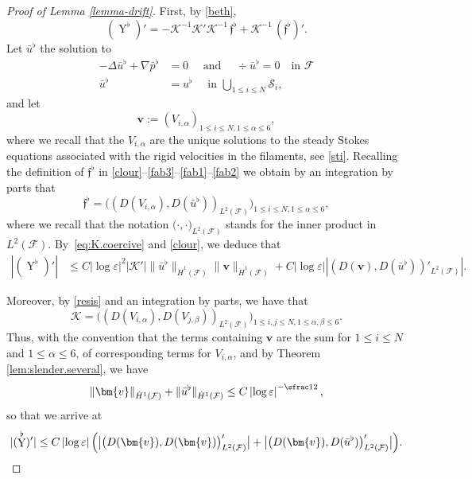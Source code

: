 \documentclass[JEP,XML,SOM,Unicode, NoEqCountersInSection,NoFloatCountersInSection,published]{cedram}
\newcommand{\bv}{\bm{v}}
\let\eps\varepsilon
\DeclareMathOperator{\Y}{Y}
\theoremstyle{definition}
\theoremstyle{remark}
\begin{document}
\begin{proof}[Proof of Lemma \ref{lemma-drift}]
First, by \eqref{beth},
\begin{equation}
(\Y^\flat)'
= - \mathcal K^{-1} \mathcal K' \mathcal K^{-1} \, \mathfrak{f}^\flat + \mathcal K^{-1} \, (\mathfrak{f}^\flat)'.
\end{equation}
Let $\bar u^\flat$ the solution to
\begin{align*}
- \Delta \bar u^\flat + \nabla \bar p^\flat &= 0 \quad \text{ and }\quad \div {\bar u^\flat} = 0 \quad \text{in } \mathcal F \\
\bar u^\flat &= u^\flat \quad \text{ in } \bigcup_{1 \leq i \leq N} \mathcal S_i,
\end{align*}
and let
\[
\bv := (V_{i,\alpha})_{1\leq i \leq N, 1 \leq \alpha \leq 6},\]
where we recall that the $ V_{i,\alpha}$ are the unique solutions to the steady Stokes equations associated with the rigid velocities in the filaments, see \eqref{sti}.
Recalling the definition of $ \mathfrak{f}^\flat $ in \eqref{clour}--\eqref{fab3}--\eqref{fab1}--\eqref{fab2}
we obtain by an integration by parts that
\begin{equation*}
\mathfrak{f}^\flat = \Big((D (V_{i,\alpha}),D (\bar u^\flat))_{L^2(\mathcal F)} \Big)_{1\leq i \leq N, 1 \leq \alpha \leq 6},
\end{equation*}
where we recall that the notation $\big(\cdot, \cdot\big)_{L^2(\mathcal F)}$ stands for the inner product in $L^2(\mathcal F)$.
By~\eqref{eq:K.coercive} and \eqref{clour},
we deduce that
\begin{equation}
\begin{aligned}
|(\Y^\flat)'| &\leq C \left|\log \eps\right|^2 |\mathcal K'| \| \bar u^\flat\|_{\dot H^1(\mathcal F)} \|\bv\|_{\dot H^1(\mathcal F)}
+ C \left|\log \eps\right| |(D (\bv), D (\bar u^\flat))'_{L^2(\mathcal F)}|.
\end{aligned}
\end{equation}

Moreover, by \eqref{resis} and an integration by parts, we have that
\begin{equation*}
\mathcal K = \Big((D (V_{i,\alpha}),D (V_{j,\beta}))_{L^2(\mathcal F)} \Big)_{1\leq i,j \leq N, 1 \leq \alpha,\beta \leq 6}.
\end{equation*}
Thus, with the convention that the terms containing $\bv$ are the sum for $1\leq i \leq N$ and $ 1 \leq \alpha \leq 6$, of corresponding terms for $V_{i,\alpha}$,
and by Theorem \ref{lem:slender.several}, we have
\[
\|\bv \|_{\dot H^1(\mathcal F)}
+ \| \bar u^\flat \|_{\dot H^1(\mathcal F)}
\leq C \left|\log \eps\right|^{-\sfrac12},\]
so that we arrive at
\begin{equation} \label{est:s..}
|(\Y^\flat)'| \leq C \left|\log \eps\right| \Bigl(\bigl|\big(D (\bv),
D (\bv)\big)_{L^2(\mathcal F)}'\bigr|
+ \bigl|\big(D(\bv), D (\bar u^\flat)\big)'_{L^2(\mathcal F)}\bigr|
\Bigr).
\end{equation}


\end{proof}
\end{document}
